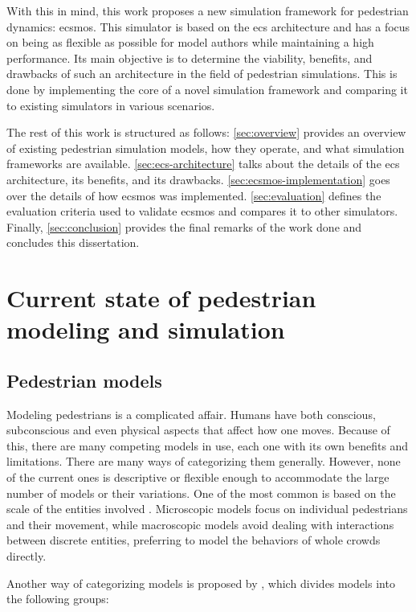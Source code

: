 \documentclass[twoside, 11pt]{article}
\begin{document}
With this in mind, this work proposes a new simulation framework for pedestrian dynamics: \gls{ecsmos}. This simulator is based on the \gls{ecs} architecture and has a focus on being as flexible as possible for model authors while maintaining a high performance. Its main objective is to determine the viability, benefits, and drawbacks of such an architecture in the field of pedestrian simulations. This is done by implementing the core of a novel simulation framework and comparing it to existing simulators in various scenarios.


The rest of this work is structured as follows: \autoref{sec:overview} provides an overview of existing pedestrian simulation models, how they operate, and what simulation frameworks are available. \autoref{sec:ecs-architecture} talks about the details of the \gls{ecs} architecture, its benefits, and its drawbacks. \autoref{sec:ecsmos-implementation} goes over the details of how \gls{ecsmos} was implemented. \autoref{sec:evaluation} defines the evaluation criteria used to validate \gls{ecsmos} and compares it to other simulators. Finally, \autoref{sec:conclusion} provides the final remarks of the work done and concludes this dissertation.

\section{Current state of pedestrian modeling and simulation} \label{sec:overview}

\subsection{Pedestrian models}

Modeling pedestrians is a complicated affair. Humans have both conscious, subconscious and even physical aspects that affect how one moves. Because of this, there are many competing models in use, each one with its own benefits and limitations. There are many ways of categorizing them generally. However, none of the current ones is descriptive or flexible enough to accommodate the large number of models or their variations. One of the most common is based on the scale of the entities involved \cite{kleinmeierVadereOpenSourceSimulation2019}. Microscopic models focus on individual pedestrians and their movement, while macroscopic models avoid dealing with interactions between discrete entities, preferring to model the behaviors of whole crowds directly.

Another way of categorizing models is proposed by \cite{martinez-gilModelingEvaluationScale2017}, which divides models into the following groups:
\end{document}
